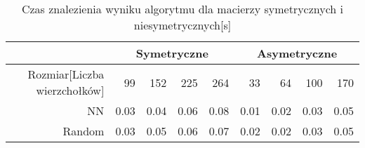 \begin{table}
\begin{tabular}{|r|r|r|r|r|r|r|r|r|}
\hline
 & \multicolumn{4}{|c|}{Symetryczne} & \multicolumn{4}{|c|}{Asymetryczne} \\ \hline\
Rozmiar[Liczba wierzchołków] & 99 & 152 & 225 & 264 & 33 & 64 & 100 & 170 \\ \hline
NN & 0.03 & 0.04 & 0.06 & 0.08 & 0.01 & 0.02 & 0.03 & 0.05 \\
Random & 0.03 & 0.05 & 0.06 & 0.07 & 0.02 & 0.02 & 0.03 & 0.05 \\ \hline
\end{tabular}
\caption{Czas znalezienia wyniku algorytmu dla macierzy symetrycznych i niesymetrycznych[s]}
\label{tab:time_AnNeigMet}
\end{table}
